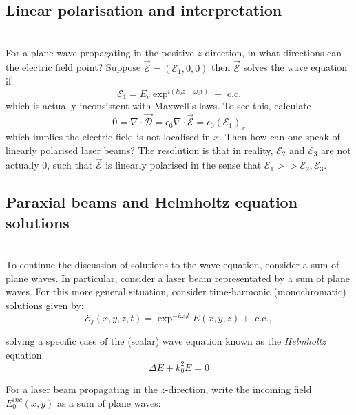 \subsection{Linear polarisation and interpretation}~\\

For a plane wave propagating in the positive $z$ direction, in what directions can the electric field point?
Suppose $\vec{\mathcal{E}}=(\mathcal{E}_1,0,0)$ then $\vec{\mathcal{E}}$ solves the wave equation if
\begin{equation}
  \mathcal{E}_1=E_c\exp^{i(k_0z-\omega_0t)}+\text{ c.c.}
\end{equation}
which is actually inconsistent with Maxwell's laws.
To see this, calculate
\begin{equation}
  0 = \nabla\cdotp\vec{\mathcal{D}}=\epsilon_0\nabla\cdotp\vec{\mathcal{E}}=\epsilon_0(\mathcal{E}_1)_x
\end{equation}
which implies the electric field is not localised in $x$.
Then how can one speak of linearly polarised laser beams?
The resolution is that in reality, $\mathcal{E}_2$ and $\mathcal{E}_3$ are not actually 0,
such that $\vec{\mathcal{E}}$ is linearly polarised in the sense that $\mathcal{E}_1>>\mathcal{E}_2,\mathcal{E}_3$.

\seperate
\subsection{Paraxial beams and Helmholtz equation solutions}~\\

To continue the discussion of solutions to the wave equation, consider a sum of plane waves.
In particular, consider a laser beam representated by a sum of plane waves.
For this more general situation, consider time-harmonic (monochromatic) solutions given by:
\begin{equation}
  \mathcal{E}_j(x,y,z,t) = \exp^{-i\omega_0t}E(x,y,z) +\text{ c.c.},
\end{equation}

solving a specific case of the (scalar) wave equation known as the \emph{Helmholtz} equation.
\begin{equation}
  \Delta E+k_0^2E=0\tag{Helmholtz}
\end{equation}

For a laser beam propagating in the $z$-direction, write the incoming field $E_0^{inc}(x,y)$ as a sum of plane waves:


